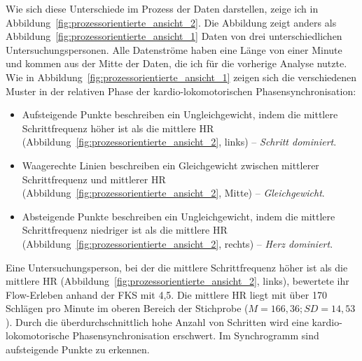 Wie sich diese Unterschiede im Prozess der Daten darstellen, zeige ich in Abbildung~\ref{fig:prozessorientierte_ansicht_2}. Die Abbildung zeigt anders als Abbildung~\ref{fig:prozessorientierte_ansicht_1} Daten von drei unterschiedlichen Untersuchungspersonen. Alle Datenströme haben eine Länge von einer Minute und kommen aus der Mitte der Daten, die ich für die vorherige Analyse nutzte. Wie in Abbildung~\ref{fig:prozessorientierte_ansicht_1} zeigen sich die verschiedenen Muster in der relativen Phase der kardio-lokomotorischen Phasensynchronisation: 
\begin{itemize}
	
	\item Aufsteigende Punkte beschreiben ein Ungleichgewicht, indem die mittlere Schrittfrequenz höher ist als die mittlere \ac{HR} (Abbildung~\ref{fig:prozessorientierte_ansicht_2}, links) -- \emph{Schritt dominiert}.
	
	\item Waagerechte Linien beschreiben ein Gleichgewicht zwischen mittlerer Schrittfrequenz und mittlerer \ac{HR} (Abbildung~\ref{fig:prozessorientierte_ansicht_2}, Mitte) -- \emph{Gleichgewicht}.
	
	\item Absteigende Punkte beschreiben ein Ungleichgewicht, indem die mittlere Schrittfrequenz niedriger ist als die mittlere \ac{HR} (Abbildung~\ref{fig:prozessorientierte_ansicht_2}, rechts) -- \emph{Herz dominiert}. 
\end{itemize}

Eine Untersuchungsperson, bei der die mittlere Schrittfrequenz höher ist als die mittlere \ac{HR} (Abbildung~\ref{fig:prozessorientierte_ansicht_2}, links), bewertete ihr Flow-Erleben anhand der \ac{FKS} mit 4,5. Die mittlere \ac{HR} liegt mit über 170 Schlägen pro Minute im oberen Bereich der Stichprobe ($M = 166{,}36; SD = 14{,}53$). Durch die überdurchschnittlich hohe Anzahl von Schritten wird eine kardio-lokomotorische Phasensynchronisation erschwert. Im Synchrogramm sind aufsteigende Punkte zu erkennen.
\begin{sidewaysfigure}
	 \caption[Beispielhafte Prozessdarstellung von mehreren Untersuchungspersonen]{Beispielhafte Prozessdarstellung -- eine Minute Daten einer Untersuchungsperson der Gruppe Schritt dominiert (links), einer Untersuchungsperson Geleichgewicht (Mitte) und einer Untersuchungsperson der Gruppe Herz dominert (rechts) \\
	\hspace{ 
	\textwidth}\emph{Anmerkung}: Mittlere SF = Mittlere Schrittfrequenz \\
	\hspace{ 
	\textwidth} Rel. Phase = Relative Phase} \label{fig:prozessorientierte_ansicht_2} 
\end{sidewaysfigure}

